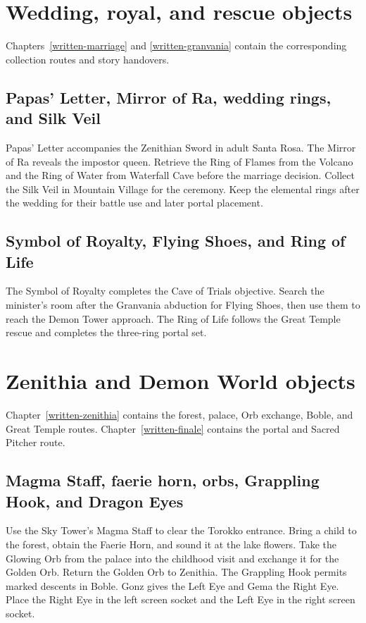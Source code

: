 \section{Wedding, royal, and rescue objects}
Chapters~\ref{written-marriage} and \ref{written-granvania} contain the corresponding collection routes and story handovers.

\subsection{Papas' Letter, Mirror of Ra, wedding rings, and Silk Veil}
Papas' Letter accompanies the Zenithian Sword in adult Santa Rosa. The Mirror of Ra reveals the impostor queen. Retrieve the Ring of Flames from the Volcano and the Ring of Water from Waterfall Cave before the marriage decision. Collect the Silk Veil in Mountain Village for the ceremony. Keep the elemental rings after the wedding for their battle use and later portal placement.

\subsection{Symbol of Royalty, Flying Shoes, and Ring of Life}
The Symbol of Royalty completes the Cave of Trials objective. Search the minister's room after the Granvania abduction for Flying Shoes, then use them to reach the Demon Tower approach. The Ring of Life follows the Great Temple rescue and completes the three-ring portal set.

\section{Zenithia and Demon World objects}
Chapter~\ref{written-zenithia} contains the forest, palace, Orb exchange, Boble, and Great Temple routes. Chapter~\ref{written-finale} contains the portal and Sacred Pitcher route.

\subsection{Magma Staff, faerie horn, orbs, Grappling Hook, and Dragon Eyes}
Use the Sky Tower's Magma Staff to clear the Torokko entrance. Bring a child to the forest, obtain the Faerie Horn, and sound it at the lake flowers. Take the Glowing Orb from the palace into the childhood visit and exchange it for the Golden Orb. Return the Golden Orb to Zenithia. The Grappling Hook permits marked descents in Boble. Gonz gives the Left Eye and Gema the Right Eye. Place the Right Eye in the left screen socket and the Left Eye in the right screen socket.

